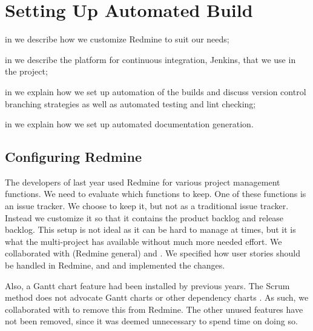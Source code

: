 \chapter{Setting Up Automated Build}\label{chap:config_management}

\begin{chapterorganization}
  \item in  we describe how we customize Redmine to suit our needs;
  \item in  we describe the platform for continuous integration, Jenkins, that we use in the project;
  \item in  we explain how we set up automation of the builds and discuss version control branching strategies as well as automated testing and lint checking;
  \item in  we explain how we set up automated documentation generation.
\end{chapterorganization}


\section{Configuring Redmine}\label{sec:redmine-conf}
The developers of last year used Redmine for various project management functions. We need to evaluate which functions to keep.
One of these functions is an issue tracker. We choose to keep it, but not as a traditional issue tracker.  Instead we customize it so that it contains the product backlog and release backlog.  This setup is not ideal as it can be hard to manage at times, but it is what the multi-project has available without much more needed effort. We collaborated with  (Redmine general) and . We specified how user stories should be handled in Redmine, and  and  implemented the changes.

Also, a Gantt chart feature had been installed by previous years. The Scrum method does not advocate Gantt charts or other dependency charts \parencite{larman2003}. As such, we collaborated with  to remove this from Redmine. The other unused features have not been removed, since it was deemed unnecessary to spend time on doing so.

